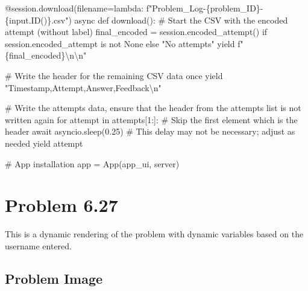 \documentclass[
  letterpaper,
  DIV=11,
  numbers=noendperiod]{scrreprt}
\newenvironment{Shaded}{\begin{snugshade}}{\end{snugshade}}
\newcommand{\NormalTok}[1]{\textcolor[rgb]{0.00,0.23,0.31}{#1}}
\begin{document}
\begin{Shaded}
\begin{Highlighting}[]
\NormalTok{    @session.download(filename=lambda: f"Problem\_Log{-}\{problem\_ID\}{-}\{input.ID()\}.csv")}
\NormalTok{    async def download():}
\NormalTok{        \# Start the CSV with the encoded attempt (without label)}
\NormalTok{        final\_encoded = session.encoded\_attempt() if session.encoded\_attempt is not None else "No attempts"}
\NormalTok{        yield f"\{final\_encoded\}\textbackslash{}n\textbackslash{}n"}
        
\NormalTok{        \# Write the header for the remaining CSV data once}
\NormalTok{        yield "Timestamp,Attempt,Answer,Feedback\textbackslash{}n"}
        
\NormalTok{        \# Write the attempts data, ensure that the header from the attempts list is not written again}
\NormalTok{        for attempt in attempts[1:]:  \# Skip the first element which is the header}
\NormalTok{            await asyncio.sleep(0.25)  \# This delay may not be necessary; adjust as needed}
\NormalTok{            yield attempt}


\NormalTok{\# App installation}
\NormalTok{app = App(app\_ui, server)}
\end{Highlighting}
\end{Shaded}

\chapter*{Problem 6.27}\label{problem-6.27}


This is a dynamic rendering of the problem with dynamic variables based
on the username entered.

\section*{Problem Image}\label{problem-image-69}

\end{document}
